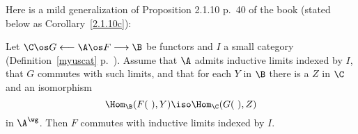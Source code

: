 \documentclass[12pt]{article}
\theoremstyle{remark}
\theoremstyle{definition}
\begin{document}
Here is a mild generalization of Proposition 2.1.10 p.~40 of the book (stated below as Corollary~\ref{2.1.10c}): 

\begin{prop}
Let $\C\os G\longleftarrow\A\os F\longrightarrow\B$ be functors and $I$ a small category (Definition~\ref{myuscat} p.~). Assume that $\A$ admits inductive limits indexed by $I$, that $G$ commutes with such limits, and that for each $Y$ in $\B$ there is a $Z$ in $\C$ and an isomorphism 
$$
\Hom_\B(F(\ ),Y)\iso\Hom_\C(G(\ ),Z)
$$
in $\A^\wg$. Then $F$ commutes with inductive limits indexed by $I$.
\end{prop}

\end{document}
